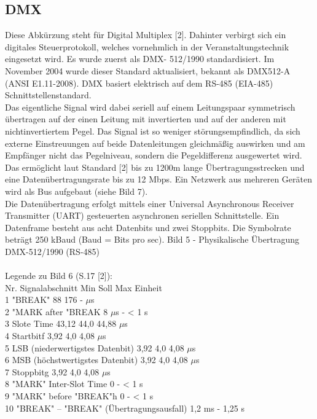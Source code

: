 \documentclass[11pt]{scrartcl}
\begin{document}
\subsection{DMX}
Diese Abkürzung steht für Digital Multiplex [2]. Dahinter verbirgt sich ein digitales Steuerprotokoll,
welches vornehmlich in der Veranstaltungstechnik eingesetzt wird. Es wurde zuerst als DMX-
512/1990 standardisiert. Im November 2004 wurde dieser Standard aktualisiert, bekannt als
DMX512-A (ANSI E1.11-2008). DMX basiert elektrisch auf dem RS-485 (EIA-485)
Schnittstellenstandard.\\
Das eigentliche Signal wird dabei seriell auf einem Leitungspaar symmetrisch übertragen auf der
einen Leitung mit invertierten und auf der anderen mit nichtinvertiertem Pegel. Das Signal ist so
weniger störungsempfindlich, da sich externe Einstreuungen auf beide Datenleitungen gleichmäßig
auswirken und am Empfänger nicht das Pegelniveau, sondern die Pegeldifferenz ausgewertet wird.
Das ermöglicht laut Standard [2] bis zu 1200m lange Übertragungsstrecken und eine
Datenübertragungsrate bis zu 12 Mbps. Ein Netzwerk aus mehreren Geräten wird als Bus aufgebaut
(siehe Bild 7).\\
Die Datenübertragung erfolgt mittels einer Universal Asynchronous Receiver Transmitter (UART)
gesteuerten asynchronen seriellen Schnittstelle. Ein Datenframe besteht aus acht Datenbits und zwei
Stoppbits. Die Symbolrate beträgt 250 kBaud (Baud = Bits pro sec).
Bild 5 - Physikalische Übertragung DMX-512/1990 (RS-485)\\
\\
Legende zu Bild 6 (S.17 [2]):\\
Nr. Signalabschnitt Min Soll Max Einheit\\
1 "BREAK" 88 176 - $\mu$s\\
2 "MARK after "BREAK 8 $\mu$s - < 1 s\\
3 Slote Time 43,12 44,0 44,88 $\mu$s\\
4 Startbitf 3,92 4,0 4,08 $\mu$s\\
5 LSB (niederwertigstes Datenbit) 3,92 4,0 4,08 $\mu$s\\
6 MSB (höchstwertigstes Datenbit) 3,92 4,0 4,08 $\mu$s\\
7 Stoppbitg 3,92 4,0 4,08 $\mu$s\\
8 "MARK" Inter-Slot Time 0 - < 1 s\\
9 "MARK" before "BREAK"h 0 - < 1 s\\
10 "BREAK" – "BREAK" (Übertragungsausfall) 1,2 ms - 1,25 s\\
\end{document}
